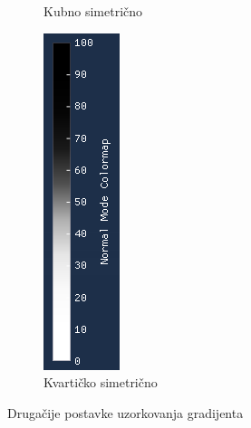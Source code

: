 \documentclass[times, utf8, diplomski]{fer}
\begin{document}
\begin{figure} [h]
\begin{subfigure}[h]{0.15\textwidth}
         \caption{Kubno simetrično}
         \label{fig:cubic_symmetrical_legend}
     \end{subfigure}
     \hfill
     \begin{subfigure}[h]{0.15\textwidth}
         \centering
         \includegraphics[width=\textwidth]{quartic_symmetrical_colormap.png}
         \caption{Kvartičko simetrično}
         \label{fig:quartic_symmetrical_legend}
     \end{subfigure}
        \caption{Drugačije postavke uzorkovanja gradijenta}
        \label{fig:colormap-legends}
\end{figure}
\end{document}
